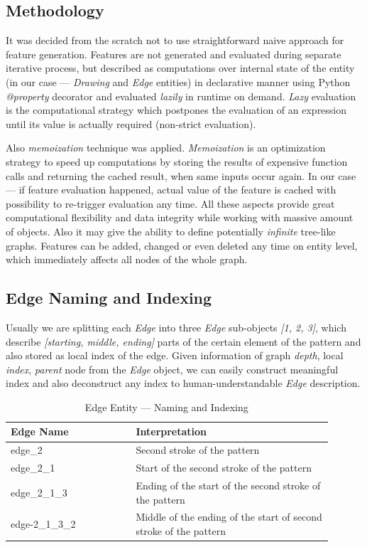 \subsection{Methodology}

It was decided from the scratch not to use straightforward naive approach for feature generation. Features are not generated and evaluated during separate iterative process, but described as computations over internal state of the entity (in our case --- \textit{Drawing} and \textit{Edge} entities) in declarative manner using Python \textit{@property} decorator and evaluated \textit{lazily} in runtime on demand. \textit{Lazy} evaluation is the computational strategy which postpones the evaluation of an expression until its value is actually required (non-strict evaluation).

Also \textit{memoization} technique was applied. \textit{Memoization} is an optimization strategy to speed up computations by storing the results of expensive function calls and returning the cached result, when same inputs occur again. In our case --- if feature evaluation happened, actual value of the feature is cached with possibility to re-trigger evaluation any time. All these aspects provide great computational flexibility and data integrity while working with massive amount of objects. Also it may give the ability to define potentially \textit{infinite} tree-like graphs. Features can be added, changed or even deleted any time on entity level, which immediately affects all nodes of the whole graph. 


\subsection{Edge Naming and Indexing}

Usually we are splitting each \textit{Edge} into three \textit{Edge} sub-objects \textit{[1, 2, 3]}, which describe \textit{[starting, middle, ending]} parts of the certain element of the pattern and also stored as local index of the edge. Given information of graph \textit{depth}, local \textit{index}, \textit{parent} node from the \textit{Edge} object, we can easily construct meaningful index and also deconstruct any index to human-understandable \textit{Edge} description.

\begin{table}[htb]
    \begin{tabular}{p{0.35\linewidth} | p{0.55\linewidth} }
        \hline
        \textbf{Edge Name} & \textbf{Interpretation} \\
        \hline
        edge\_2 & Second stroke of the pattern \\ 
        edge\_2\_1 & Start of the second stroke of the pattern \\ 
        edge\_2\_1\_3 & Ending of the start of the second stroke of the pattern \\ 
        edge-2\_1\_3\_2 & Middle of the ending of the start of second stroke of the pattern \\ 
        \hline
    \end{tabular}
    \caption{Edge Entity --- Naming and Indexing}
\end{table}

